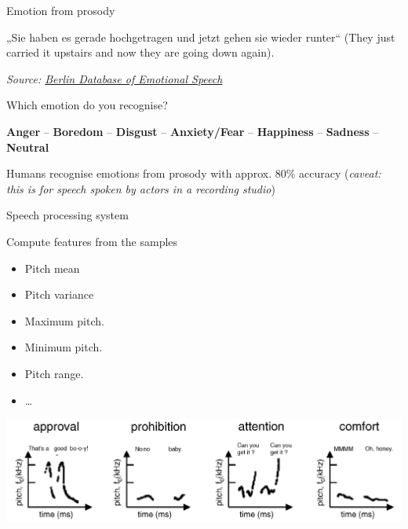 \documentclass[compress]{beamer}
\newcommand{\source}[2]{{\tiny\it Source: \href{#1}{#2}}}
\begin{document}
\begin{frame}{Emotion from prosody}

„Sie haben es gerade hochgetragen und jetzt gehen sie wieder runter``
(They just carried it upstairs and now they are going down again).

    \begin{center}
    \hspace{0.3em}
    \hspace{0.3em}
    \hspace{0.3em}
    \hspace{0.3em}
    \end{center}

    \source{http://emodb.bilderbar.info/start.html}{Berlin Database of
  Emotional Speech}


Which emotion do you recognise?


    \textbf{Anger} -- \textbf{Boredom} -- \textbf{Disgust} -- \textbf{Anxiety/Fear} -- \textbf{Happiness} --
    \textbf{Sadness} --  \textbf{Neutral}

Humans recognise emotions from prosody with approx. 80\% accuracy
(\textit{caveat: this is for speech spoken by actors in a recording studio})

\end{frame}

\begin{frame}{Speech processing system}

Compute features from the samples

\begin{itemize}

\item Pitch mean
\item Pitch variance
\item Maximum pitch.
\item Minimum pitch.
\item Pitch range.
\item \ldots{}
\end{itemize}

    \begin{center}
        \includegraphics[width=0.8\linewidth]{prosody}
    \end{center}

\end{frame}
\end{document}
